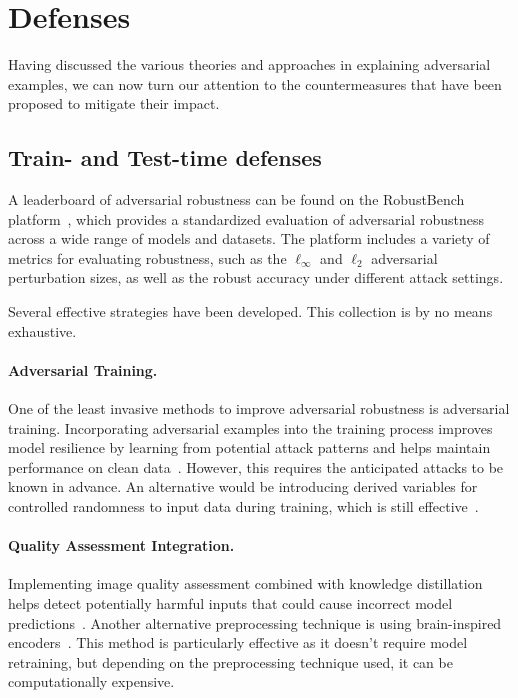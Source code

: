 \documentclass[a4paper, oneside]{discothesis}
\begin{document}
\section{Defenses}

Having discussed the various theories and approaches in explaining adversarial examples, we can now turn our attention to the countermeasures that have been proposed to mitigate their impact.

\subsection{Train- and Test-time defenses}

A leaderboard of adversarial robustness can be found on the RobustBench platform~\cite{croce2021robustbench}, which provides a standardized evaluation of adversarial robustness across a wide range of models and datasets. The platform includes a variety of metrics for evaluating robustness, such as the $\ell_\infty$ and $\ell_2$ adversarial perturbation sizes, as well as the robust accuracy under different attack settings.

Several effective strategies have been developed. This collection is by no means exhaustive.

\paragraph{Adversarial Training.} One of the least invasive methods to improve adversarial robustness is adversarial training. Incorporating adversarial examples into the training process improves model resilience by learning from potential attack patterns and helps maintain performance on clean data~\cite{araujo2020advocating, Ren2022VulnerabilityAR}. However, this requires the anticipated attacks to be known in advance. An alternative would be introducing derived variables for controlled randomness to input data during training, which is still effective~\cite{Adeke2023SecuringNT}.

\paragraph{Quality Assessment Integration.} Implementing image quality assessment combined with knowledge distillation helps detect potentially harmful inputs that could cause incorrect model predictions~\cite{feng2020towards}. Another alternative preprocessing technique is using brain-inspired encoders~\cite{Rakhimberdina2022StrengtheningRU}. This method is particularly effective as it doesn't require model retraining, but depending on the preprocessing technique used, it can be computationally expensive.
\end{document}
